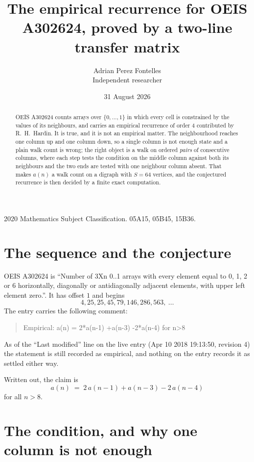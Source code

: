 \documentclass[11pt,a4paper]{article}
\title{The empirical recurrence for OEIS A302624, proved by a two-line transfer matrix}
\author{Adrian Perez Fontelles\\ \small Independent researcher}
\date{31 August 2026}
\theoremstyle{plain}
\theoremstyle{definition}
\begin{document}
\maketitle

\begin{abstract}
OEIS A302624 counts arrays over $\{0,\dots,1\}$ in which every cell is constrained by the
values of its neighbours, and carries an empirical recurrence of order $4$ contributed
by R.~H.~Hardin. It is true, and it is not an empirical matter. The neighbourhood reaches one
column up and one column down, so a single column is not enough state and a plain walk count
is wrong; the right object is a walk on ordered \emph{pairs} of consecutive columns, where
each step tests the condition on the middle column against both its neighbours and the two
ends are tested with one neighbour column absent. That makes $a(n)$ a walk count on a digraph
with $S=64$ vertices, and the conjectured recurrence is then decided by a finite exact
computation.
\end{abstract}

\noindent\small 2020 Mathematics Subject Classification. 05A15, 05B45, 15B36.\normalsize

\section{The sequence and the conjecture}

OEIS A302624 is ``Number of 3Xn 0..1 arrays with every element equal to 0, 1, 2 or 6 horizontally, diagonally or antidiagonally adjacent elements, with upper left element zero.''. It has offset $1$ and begins
\[
4, 25, 25, 45, 79, 146, 286, 563,\ \dots
\]
The entry carries the following comment:
\begin{quote}\small
Empirical: a(n) = 2*a(n-1) +a(n-3) -2*a(n-4) for n>8
\end{quote}
As of the ``Last modified'' line on the live entry (Apr 10 2018 19:13:50, revision 4) the statement is
still recorded as empirical, and nothing on the entry records it as settled either way.

Written out, the claim is
\begin{equation}\label{eq:conj}
a(n)\;=\;2\,a(n-1) + a(n-3) - 2\,a(n-4)
\end{equation}
for all $n>8$.

\section{The condition, and why one column is not enough}
\end{document}
